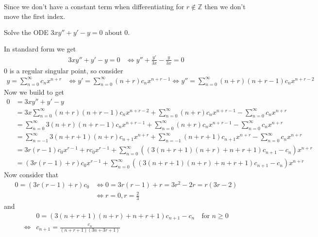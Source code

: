 \documentclass[notes]{subfiles}
\begin{document}
Since we don't have a constant term when differentiating for $r \notin \mathbb{Z}$ then we don't move the first index.

\begin{exercise}
    Solve the ODE $3xy'' + y' - y = 0$ about $0$.
\end{exercise}
\begin{solution}
    In standard form we get
    \begin{align*}
        3xy'' + y' - y = 0
        &\iff y'' + \frac{y'}{3x} - \frac{y}{3x} = 0
    \end{align*}
    $0$ is a regular singular point, so consider
    \begin{align*}
        y = \sum_{n = 0}^\infty c_n x^{n + r}
        &\iff y' = \sum_{n = 0}^\infty (n + r)c_n x^{n + r - 1}
        \iff y'' = \sum_{n = 0}^\infty (n + r)(n + r - 1)c_n x^{n + r - 2}
    \end{align*}
    Now we build to get
    \begin{align*}
        0
        &= 3xy'' + y' - y \\
        &= 3x\sum_{n = 0}^\infty (n + r)(n + r - 1)c_n x^{n + r - 2} + \sum_{n = 0}^\infty (n + r)c_n x^{n + r - 1} - \sum_{n = 0}^\infty c_n x^{n + r} \\
        &= \sum_{n = 0}^\infty 3(n + r)(n + r - 1)c_n x^{n + r - 1} + \sum_{n = 0}^\infty (n + r)c_n x^{n + r - 1} - \sum_{n = 0}^\infty c_n x^{n + r} \\
        &= \sum_{n = -1}^\infty 3(n + r + 1)(n + r)c_{n + 1} x^{n + r} + \sum_{n = -1}^\infty (n + r + 1)c_{n + 1} x^{n + r} - \sum_{n = 0}^\infty c_n x^{n + r} \\
        &= 3r(r - 1)c_0x^{r - 1} + rc_0x^{r - 1} + \sum_{n = 0}^\infty ((3(n + r + 1)(n + r) + n + r + 1)c_{n + 1} - c_n)x^{n + r} \\
        &= (3r(r - 1) + r)c_0x^{r - 1} + \sum_{n = 0}^\infty ((3(n + r + 1)(n + r) + n + r + 1)c_{n + 1} - c_n)x^{n + r}
    \end{align*}
    Now consider that
    \begin{align*}
        0 = (3r(r - 1) + r)c_0
        &\iff 0 = 3r(r - 1) + r = 3r^2 - 2r = r(3r - 2) \\
        &\iff r = 0, r = \frac{2}{3}
    \end{align*}
    and
    \begin{align*}
        &0 = (3(n + r + 1)(n + r) + n + r + 1)c_{n + 1} - c_n \quad \text{for $n \geq 0$} \\
        \iff& c_{n + 1} = \frac{c_n}{(n + r + 1)(3n + 3r + 1)}

\end{align*}
\end{solution}
\end{document}
